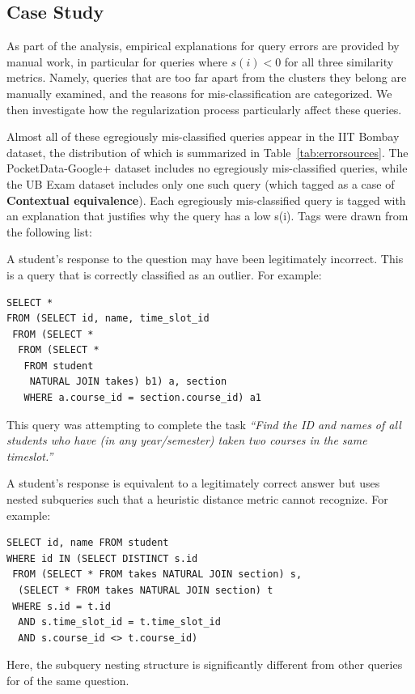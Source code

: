 \subsection{Case Study}
As part of the analysis, empirical explanations for query errors are provided by manual work, in particular for queries where $s(i) < 0$ for all three similarity metrics. 
Namely, queries that are too far apart from the clusters they belong are manually examined, and the reasons for mis-classification are categorized. 
We then investigate how the regularization process particularly affect these queries. 

Almost all of these egregiously mis-classified queries appear in the IIT Bombay dataset, the distribution of which is summarized in Table~\ref{tab:errorsources}.
The PocketData-Google+ dataset includes no egregiously mis-classified queries, while the UB Exam dataset includes only one such query (which tagged as a case of \textbf{Contextual equivalence}).
Each egregiously mis-classified query is tagged with an explanation that justifies why the query has a low s(i). 
Tags were drawn from the following list:

\smallskip
{} A student's response to the question may have been legitimately incorrect. This is a query that is correctly classified as an outlier.
For example: 
{\footnotesize
\begin{verbatim}
SELECT *
FROM (SELECT id, name, time_slot_id
 FROM (SELECT *
  FROM (SELECT *
   FROM student
    NATURAL JOIN takes) b1) a, section
   WHERE a.course_id = section.course_id) a1
\end{verbatim}
}
This query was attempting to complete the task \textit{``Find the ID and names of all students who have (in any year/semester) taken two courses in the same timeslot.''}

\smallskip
{} A student's response is equivalent to a legitimately correct answer but uses nested subqueries such that a heuristic distance metric cannot recognize.
For example: 
{\footnotesize
\begin{verbatim}
SELECT id, name FROM student
WHERE id IN (SELECT DISTINCT s.id
 FROM (SELECT * FROM takes NATURAL JOIN section) s,
  (SELECT * FROM takes NATURAL JOIN section) t
 WHERE s.id = t.id
  AND s.time_slot_id = t.time_slot_id
  AND s.course_id <> t.course_id)
\end{verbatim}
}

Here, the subquery nesting structure is significantly different from other queries for of the same question.

